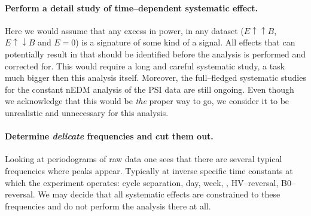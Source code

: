 \paragraph{Perform a detail study of time--dependent systematic effect.}
Here we would assume that any excess in power, in any dataset ($E \uparrow \uparrow B$, $E \uparrow \downarrow B$ and $E=0$) is a signature of some kind of a signal. All effects that can potentially result in that should be identified before the analysis is performed and corrected for. This would require a long and careful systematic study, a task much bigger then this analysis itself. Moreover, the full--fledged systematic studies for the constant nEDM analysis of the PSI data are still ongoing. Even though we acknowledge that this would be \emph{the} proper way to go, we consider it to be unrealistic and unnecessary for this analysis.

\paragraph{Determine \emph{delicate} frequencies and cut them out.}
Looking at periodograms of raw data one sees that there are several typical frequencies where peaks appear. Typically at inverse specific time constants at which the experiment operates: cycle separation, day, week, , HV--reversal, B0--reversal. We may decide that all systematic effects are constrained to these frequencies and do not perform the analysis there at all.

